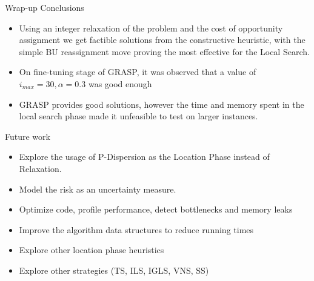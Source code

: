 \documentclass{beamer}
\begin{document}
\begin{frame}{Wrap-up}
    \small Conclusions
    \scriptsize
    \begin{itemize}
        \item Using an integer relaxation of the problem and the cost of opportunity assignment we get factible solutions from the constructive heuristic, with the simple BU reassignment move proving the most effective for the Local Search.
        \item On fine-tuning stage of GRASP, it was observed that a value of $i_{max} = 30, \alpha = 0.3$ was good enough
        \item GRASP provides good solutions, however the time and memory spent in the local search phase made it unfeasible to test on larger instances.
    \end{itemize}
    \small Future work
    \scriptsize
    \begin{itemize}
        \item Explore the usage of P-Dispersion as the Location Phase instead of Relaxation.
        \item Model the risk as an uncertainty measure.
        \item Optimize code, profile performance, detect bottlenecks and memory leaks
        \item Improve the algorithm data structures to reduce running times
        \item Explore other location phase heuristics
        \item Explore other strategies (TS, ILS, IGLS, VNS, SS)
    \end{itemize}
\end{frame}
\end{document}
